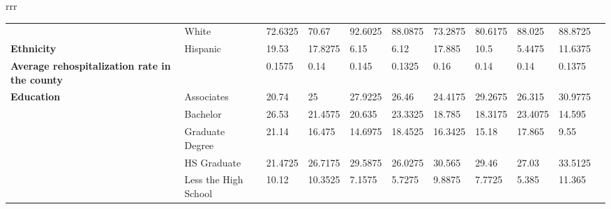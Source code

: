 \documentclass[12pt]{article}
\begin{document}
\begin{table}[tbp]
\begin{tabular}{rrr}
\begin{table}[]
\begin{tabular}{lllllllllll}
                                                            & White                                        & 72.6325          & 70.67           & 92.6025           & 88.0875          & 73.2875          & 80.6175           & 88.025         & 88.8725        &  \\
    \textbf{Ethnicity}                                      & Hispanic                                     & 19.53            & 17.8275         & 6.15              & 6.12             & 17.885           & 10.5              & 5.4475         & 11.6375        &  \\
    \textbf{Average rehospitalization rate   in the county} &                                              & 0.1575           & 0.14            & 0.145             & 0.1325           & 0.16             & 0.14              & 0.14           & 0.1375         &  \\
    \textbf{Education}                                      & Associates                                   & 20.74            & 25              & 27.9225           & 26.46            & 24.4175          & 29.2675           & 26.315         & 30.9775        &  \\
                                                            & Bachelor                                     & 26.53            & 21.4575         & 20.635            & 23.3325          & 18.785           & 18.3175           & 23.4075        & 14.595         &  \\
                                                            & Graduate Degree                              & 21.14            & 16.475          & 14.6975           & 18.4525          & 16.3425          & 15.18             & 17.865         & 9.55           &  \\
                                                            & HS Graduate                                  & 21.4725          & 26.7175         & 29.5875           & 26.0275          & 30.565           & 29.46             & 27.03          & 33.5125        &  \\
                                                            & Less the High School                         & 10.12            & 10.3525         & 7.1575            & 5.7275           & 9.8875           & 7.7725            & 5.385          & 11.365         & 
    \end{tabular}
    \end{table}
   \bottomrule
\end{tabular}
\end{table}
\end{document}

